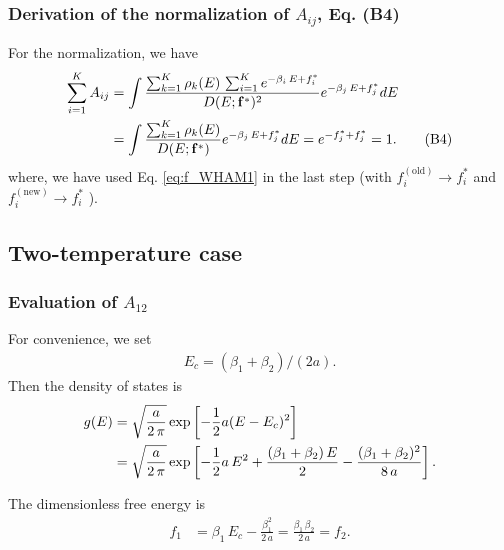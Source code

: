 \documentclass[aip,jcp,preprint,notitlepage, superscriptaddress]{revtex4-1}
\begin{document}
\subsubsection{Derivation of the normalization of $A_{ij}$, Eq. (B4)}



For the normalization, we have
\begin{align}
\sum_{i = 1}^K
A_{ij}
&=
\int
\frac
{
  \sum_{k=1}^K \rho_k(E) \,
  \sum_{i = 1}^K e^{-\beta_i \, E + f_i^*}
}
{
  D(E; \mathbf{f}^*)^2
}
e^{-\beta_j \, E + f_j^*}
dE
\notag \\
&=
\int
\frac
{
  \sum_{k=1}^K \rho_k(E)
}
{
  D(E; \mathbf{f}^*)
}
e^{-\beta_j \, E + f_j^*}
dE
=
e^{-f_j^* + f_j^*} = 1.
\tag{B4}
\label{eq:Aij_normalization}
\end{align}
%
where,
we have used Eq. \eqref{eq:f_WHAM1}
in the last step
(with
$f_i^\mathrm{(old)} \rightarrow f_i^*$
and
$f_i^\mathrm{(new)} \rightarrow f_i^*$
).




\subsection{Two-temperature case}

\subsubsection{Evaluation of $A_{12}$}



For convenience,
we set
\begin{align}
  E_c = (\beta_1 + \beta_2)/(2a).
  \label{eq:Ec_twoT}
\end{align}
%
Then the density of states is
%
\begin{align}
g(E)
&=
\sqrt{ \frac a { 2 \, \pi } }
\exp
\left[
  -\frac 1 2 a
  (E - E_c)^2
\right]
\notag \\
&=
\sqrt{ \frac a { 2 \, \pi } }
\exp
\left[
  -\frac 1 2 a \, E^2
  + \frac{
    (\beta_1 + \beta_2) \, E
  }{2}
  - \frac{
    (\beta_1 + \beta_2)^2
  }{ 8 \, a }
\right].
\end{align}


The dimensionless free energy is
%
\begin{align}
f_1
&=
\beta_1 \, E_c
- \frac{ \beta_1^2 } { 2 \, a }
=
\frac{\beta_1 \, \beta_2 } { 2 \, a }
= f_2.
\end{align}
\end{document}
